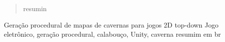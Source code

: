

\begin{abstract}
resumin
\end{abstract}

\begin{englishabstract}
{Geração procedural de mapas de cavernas para jogos 2D top-down}
{Jogo eletrônico, geração procedural, calabouço, Unity, caverna}
 resumim em br
\end{englishabstract}




